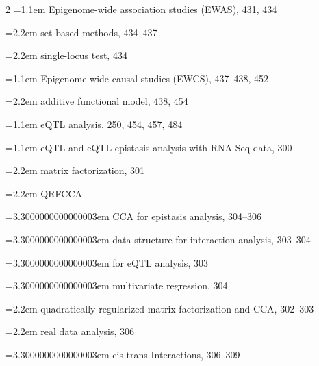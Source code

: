 \begin{multicols}{2}
\noindent\hangindent=1.1em Epigenome-wide association studies (EWAS), 431, 434\par
\noindent\hangindent=2.2em \hspace*{1.1em}set-based methods, 434--437\par
\noindent\hangindent=2.2em \hspace*{1.1em}single-locus test, 434\par
\noindent\hangindent=1.1em Epigenome-wide causal studies (EWCS), 437--438, 452\par
\noindent\hangindent=2.2em \hspace*{1.1em}additive functional model, 438, 454\par
\noindent\hangindent=1.1em eQTL analysis, 250, 454, 457, 484\par
\noindent\hangindent=1.1em eQTL and eQTL epistasis analysis with RNA-Seq data, 300\par
\noindent\hangindent=2.2em \hspace*{1.1em}matrix factorization, 301\par
\noindent\hangindent=2.2em \hspace*{1.1em}QRFCCA\par
\noindent\hangindent=3.3000000000000003em \hspace*{2.2em}CCA for epistasis analysis, 304--306\par
\noindent\hangindent=3.3000000000000003em \hspace*{2.2em}data structure for interaction analysis, 303--304\par
\noindent\hangindent=3.3000000000000003em \hspace*{2.2em}for eQTL analysis, 303\par
\noindent\hangindent=3.3000000000000003em \hspace*{2.2em}multivariate regression, 304\par
\noindent\hangindent=2.2em \hspace*{1.1em}quadratically regularized matrix factorization and CCA, 302--303\par
\noindent\hangindent=2.2em \hspace*{1.1em}real data analysis, 306\par
\noindent\hangindent=3.3000000000000003em \hspace*{2.2em}cis-trans Interactions, 306--309\par

\end{multicols}
